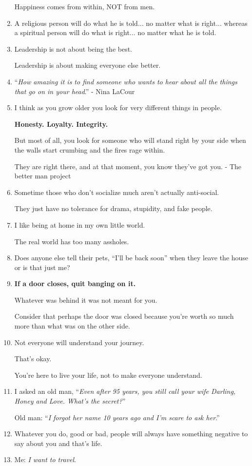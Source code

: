 \documentclass{article}
\begin{document}
\begin{enumerate}
	Happiness comes from within, NOT from men.
	\item A religious person will do what he is told$\ldots$ no matter what is right$\ldots$ whereas a spiritual person will do what is right$\ldots$ no matter what he is told.
	\item Leadership is not about being the best.
	
	Leadership is about making everyone else better.
	\item ``\textit{How amazing it is to find someone who wants to hear about all the things that go on in your head}.'' - Nina LaCour
	\item I think as you grow older you look for very different things in people.
	
	\textbf{Honesty. Loyalty. Integrity.}
	
	But most of all, you look for someone who will stand right by your side when the walls start crumbing and the fires rage within.
	
	They are right there, and at that moment, you know they've got you. - The better man project
	\item Sometime those who don't socialize much aren't actually anti-social.
	
	They just have no tolerance for drama, stupidity, and fake people.
	\item I like being at home in my own little world.
	
	The real world has too many assholes.
	\item Does anyone else tell their pets, ``I'll be back soon'' when they leave the house or is that just me?
	\item \textbf{If a door closes, quit banging on it.}
	
	Whatever was behind it was not meant for you.
	
	Consider that perhaps the door was closed because you're worth so much more than what was on the other side.
	\item Not everyone will understand your journey.
	
	That's okay.
	
	You're here to live your life, not to make everyone understand.
	\item I asked an old man, ``\textit{Even after 95 years, you still call your wife Darling, Honey and Love. What's the secret?}''
	
	Old man: ``\textit{I forgot her name 10 years ago and I'm scare to ask her}.''
	\item Whatever you do, good or bad, people will always have something negative to say about you and that's life.
	\item Me: \textit{I want to travel}.
	

\end{enumerate}
\end{document}
